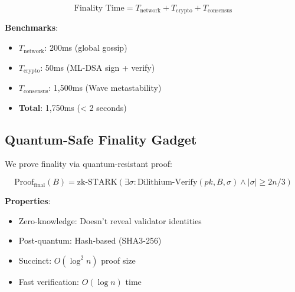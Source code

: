 \begin{equation}
\text{Finality Time} = T_{\text{network}} + T_{\text{crypto}} + T_{\text{consensus}}
\end{equation}

\textbf{Benchmarks}:
\begin{itemize}
    \item $T_{\text{network}}$: 200ms (global gossip)
    \item $T_{\text{crypto}}$: 50ms (ML-DSA sign + verify)
    \item $T_{\text{consensus}}$: 1,500ms (Wave metastability)
    \item \textbf{Total}: 1,750ms (< 2 seconds)
\end{itemize}

\subsection{Quantum-Safe Finality Gadget}

We prove finality via quantum-resistant proof:

\begin{equation}
\text{Proof}_{\text{final}}(B) = \text{zk-STARK}(\exists \sigma : \text{Dilithium-Verify}(pk, B, \sigma) \land |\sigma| \geq 2n/3)
\end{equation}

\textbf{Properties}:
\begin{itemize}
    \item Zero-knowledge: Doesn't reveal validator identities
    \item Post-quantum: Hash-based (SHA3-256)
    \item Succinct: $O(\log^2 n)$ proof size
    \item Fast verification: $O(\log n)$ time
\end{itemize}

